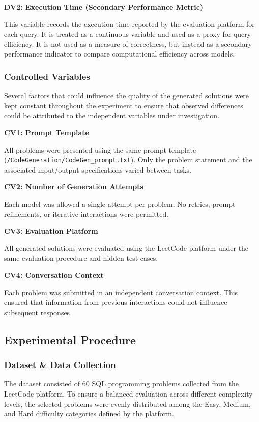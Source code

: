 \documentclass[11pt,a4paper]{article}
\begin{document}
    \textbf{DV2: Execution Time (Secondary Performance Metric)}

    This variable records the execution time reported by the evaluation platform for each query. It is treated as a continuous variable and used as a proxy for query efficiency. It is not used as a measure of correctness, but instead as a secondary performance indicator to compare computational efficiency across models.

    \subsubsection{Controlled Variables}

    Several factors that could influence the quality of the generated solutions were kept constant throughout the experiment to ensure that observed differences could be attributed to the independent variables under investigation.

    \textbf{CV1: Prompt Template}

    All problems were presented using the same prompt template (\texttt{/CodeGeneration/CodeGen\_prompt.txt}). Only the problem statement and the associated input/output specifications varied between tasks.

    \textbf{CV2: Number of Generation Attempts}

    Each model was allowed a single attempt per problem. No retries, prompt refinements, or iterative interactions were permitted.

    \textbf{CV3: Evaluation Platform}

    All generated solutions were evaluated using the LeetCode platform under the same evaluation procedure and hidden test cases.

    \textbf{CV4: Conversation Context}

    Each problem was submitted in an independent conversation context. This ensured that information from previous interactions could not influence subsequent responses.


\subsection{Experimental Procedure}
\subsubsection{Dataset \& Data Collection}

The dataset consisted of 60 SQL programming problems collected from the LeetCode platform. To ensure a balanced evaluation across different complexity levels, the selected problems were evenly distributed among the Easy, Medium, and Hard difficulty categories defined by the platform.
\end{document}
